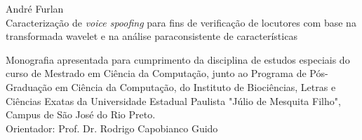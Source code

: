 \vspace{4cm}
\fontsize{14}{\baselineskip} 
\selectfont
\vspace{30.0pt}
{André Furlan} \\ \vspace{30.0pt}
{Caracterização de \textit{voice spoofing} para fins de verificação de locutores com base na transformada wavelet e na análise paraconsistente de características} \\ \onehalfspacing 

\fontsize{14}{\baselineskip} \selectfont
\par \null
\begin{flushright}
\parbox{3.50in}{
	\fontsize{12}{\baselineskip} \selectfont \onehalfspacing
	Monografia apresentada para cumprimento da disciplina de estudos especiais do curso de Mestrado em Ciência da Computação, junto ao Programa de Pós-Graduação em Ciência da Computação, do Instituto de Biociências, Letras e Ciências Exatas da Universidade Estadual Paulista "Júlio de Mesquita Filho", Campus de São José do Rio Preto. \\ \vspace{1.0pt}
	{Orientador: Prof. Dr. Rodrigo Capobianco Guido } \\ \vspace{1.0pt}
}
\end{flushright}